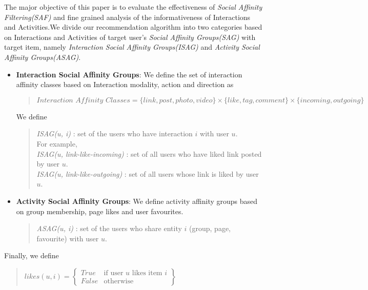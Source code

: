 
The major objective of this paper is to evaluate the effectiveness of \textit{Social Affinity Filtering(SAF)} and fine grained 
analysis of the informativeness of Interactions and Activities.We divide our recommendation algorithm into two categories based 
on Interactions and Activities of target user's \textit{ Social Affinity Groups(SAG)} with target item, 
namely \textit{Interaction  Social Affinity Groups(ISAG)} and \textit{Activity Social Affinity Groups(ASAG)}.

\begin{itemize}
  \item \textbf{Interaction  Social Affinity Groups}: We define the set of interaction affinity classes based on 
  Interaction modality, action and direction as
  \begin{quote}
  \begin{math}
  	\textit{Interaction Affinity Classes} = \{link, post, photo, video\} \times \{like, tag, comment\} \times \{incoming, outgoing\}
  \end{math}
  \end{quote}
  We define 
  \begin{quote}
  \textit{ISAG(u, i)} : set of the users who have interaction $i$ with user $u$.\\
   For example,\\
   \textit{ISAG(u, link-like-incoming)} : set of all users who have liked link posted by user $u$. \\
   \textit{ISAG(u, link-like-outgoing)} : set of all users whose link is liked by user $u$. \\
  \end{quote}
\item \textbf{Activity Social Affinity Groups}: We define activity affinity groups based on group membership, page likes and user favourites.
	\begin{quote}
	\textit{ASAG(u, i)} : set of the users who share entity $i$ (group, page, favourite) with user $u$.   
	\end{quote}
\end{itemize}
Finally, we define
\begin{quote}
\begin{math}
likes(u,i) =  \begin{Bmatrix}
	  True & \text{if user $u$ likes item $i$}\\
	  False & \text{otherwise}
	  \end{Bmatrix}
\end{math}
\end{quote}
